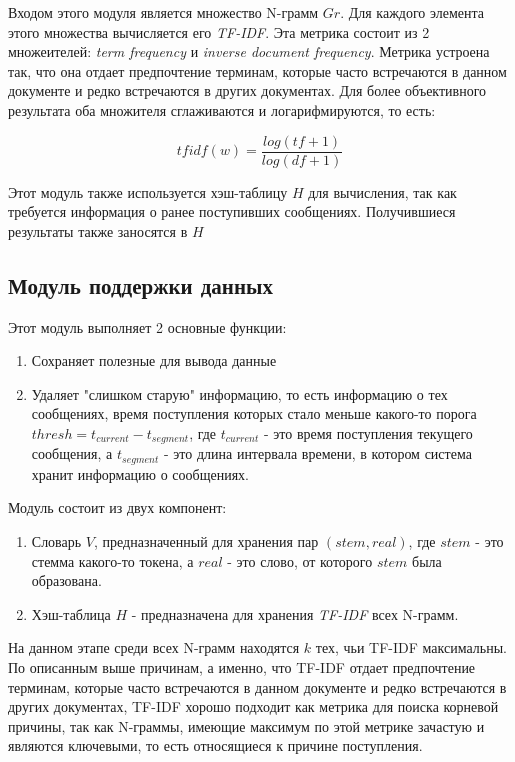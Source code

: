 \documentclass[a4paper,12pt,preview]{report} %
\begin{document}
	Входом этого модуля является множество N-грамм $Gr$. Для каждого элемента этого множества вычисляется его \textit{TF-IDF}. Эта метрика состоит из 2 множеителей: \textit{term frequency} и \textit{inverse document frequency}. Метрика устроена так, что она отдает предпочтение терминам, которые часто встречаются в данном документе и редко встречаются в других документах. Для более объективного результата оба множителя сглаживаются и логарифмируются, то есть:
	
	\begin{equation}
	tfidf(w) = \dfrac{log(tf+1)}{log(df+1)}
	\end{equation}
	
	
	 Этот модуль также используется хэш-таблицу $H$ для вычисления, так как требуется информация о ранее поступивших сообщениях. 
	 Получившиеся результаты также заносятся в $H$
	
	\subsection{Модуль поддержки данных}
	Этот модуль выполняет 2 основные функции:
	\begin{enumerate}
		\item Сохраняет полезные для вывода данные
		\item Удаляет "слишком старую" информацию, то есть информацию о тех сообщениях, время поступления которых стало меньше какого-то порога $thresh = t_{current} - t_{segment}$, где $t_{current}$ - это время поступления текущего сообщения, а $t_{segment}$ - это длина интервала времени, в котором система хранит информацию о сообщениях. 
	\end{enumerate}
	
	Модуль состоит из двух компонент:
	\begin{enumerate}
		\item Словарь $V$, предназначенный для хранения пар $(stem, real)$, где $stem$ - это стемма какого-то токена, а $real$ - это слово, от которого $stem$ была образована.
		\item Хэш-таблица $H$ - предназначена для хранения \textit{TF-IDF} всех N-грамм.
	\end{enumerate}
	 
	 
	 На данном этапе среди всех N-грамм находятся $k$ тех, чьи TF-IDF максимальны. По описанным выше причинам, а именно, что TF-IDF отдает предпочтение терминам, которые часто встречаются в данном документе и редко встречаются в других документах, TF-IDF хорошо подходит как метрика для поиска корневой причины, так как N-граммы, имеющие максимум по этой метрике зачастую и являются ключевыми, то есть относящиеся к причине поступления.
	 
\end{document}
